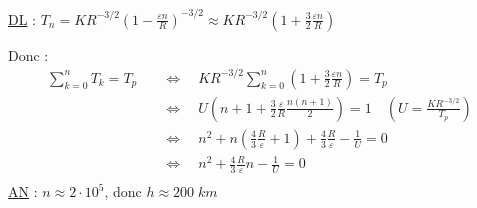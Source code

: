 \vspace{1em}
\uline{DL} : $\displaystyle T_n = KR^{-3/2}\left(1-\frac {\varepsilon n} {R}\right)^{-3/2}
\approx KR^{-3/2}\left(1+ \frac {3} {2} \frac {\varepsilon n} {R}\right)$

\vspace{1em}
Donc :
\begin{align*}
\sum_{k=0}^{n} T_k = T_{p} \quad &\Leftrightarrow \quad KR^{-3/2} \sum_{k=0}^{n}\left(1 +\frac {3} {2} \frac {\varepsilon n} {R}\right) = T_p \\
&\Leftrightarrow \quad U\left(n + 1 + \frac {3} {2} \frac {\varepsilon} {R} \frac {n(n+1)} {2} \right) = 1 \quad \left(U = \frac {KR^{-3/2}} {T_p}\right) \\
&\Leftrightarrow \quad n^2 + n\left(\frac {4} {3} \frac {R} {\varepsilon} + 1\right) + \frac {4} {3} \frac {R} {\varepsilon} - \frac {1} {U} = 0 \\
&\Leftrightarrow \quad n^2 + \frac {4} {3} \frac {R} {\varepsilon}n - \frac {1} {U} = 0 \\
\end{align*}
\uline{AN} : $n \approx 2\cdot 10^5$, donc $\displaystyle \boxed {h \approx 200 \; km}$
